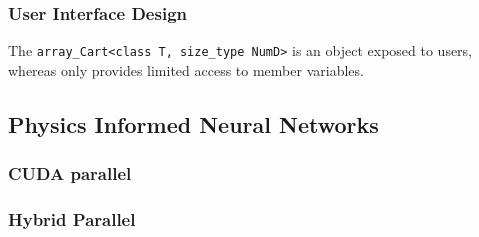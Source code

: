 \subsubsection{User Interface Design}
The \texttt{array\_Cart<class T, size\_type NumD>} is an object exposed to users, whereas only provides limited access to member variables.




\subsection{Physics Informed Neural Networks}
\subsubsection{CUDA parallel}
\subsubsection{Hybrid Parallel}
